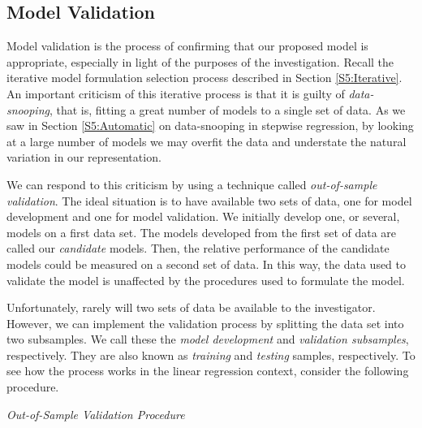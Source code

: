 \subsection{Model Validation}\label{S5:ModelValidation}

Model validation is the process of confirming that our proposed
model is appropriate, especially in light of the purposes of the
investigation. Recall the iterative model formulation selection
process described in Section \ref{S5:Iterative}. An important
criticism of this iterative process is that it is guilty of
\emph{data-snooping}, that is, fitting a great number of models to a
single set of data. As we saw in Section \ref{S5:Automatic} on
data-snooping in stepwise regression, by looking at a large number
of models we may overfit the data and understate the natural
variation in our representation.

We can respond to this criticism by using a technique called
\textit{out-of-sample} \textit{validation}. The ideal situation is
to have available two sets of data, one for model development and
one for model validation. We initially develop one, or several,
models on a first data set. The models developed from the first set
of data are called our \emph{candidate} models. Then, the relative
performance of the candidate models could be measured on a second
set of data. In this way, the data used to validate the model is
unaffected by the procedures used to formulate the model.

Unfortunately, rarely will two sets of data be available to the
investigator. However, we can implement the validation process by
splitting the data set into two subsamples. We call these the
\textit{model development} and \textit{validation subsamples},
respectively. They are also known as \emph{training} and
\emph{testing} samples, respectively. To see how the process works
in the linear regression context, consider the following procedure.

\bigskip
\boxedjed

\textit{Out-of-Sample Validation Procedure}

